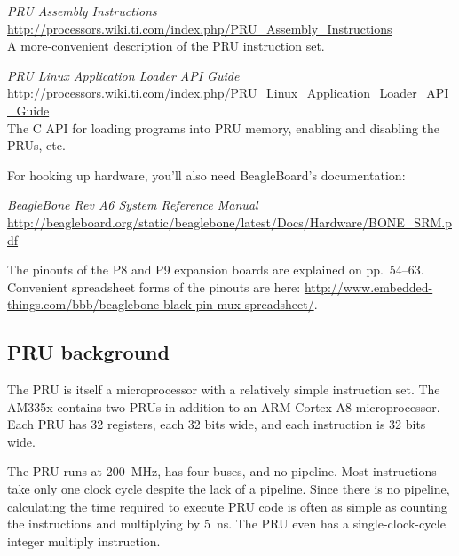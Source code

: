 \documentclass[letterpaper,11pt,fleqn]{article}
\newenvironment{docref}
   {\vspace{\baselineskip}\noindent\begin{minipage}{\textwidth}\raggedright}
   {\end{minipage}}
\begin{document}
\begin{docref}
\textit{PRU Assembly Instructions} \\
\url{http://processors.wiki.ti.com/index.php/PRU\_Assembly\_Instructions} \\
A more-convenient description of the PRU instruction set.
\end{docref}

\begin{docref}
\textit{PRU Linux Application Loader API Guide} \\
\url{http://processors.wiki.ti.com/index.php/PRU\_Linux\_Application\_Loader\_API\_Guide} \\
The C API for loading programs into PRU memory, enabling and disabling the
PRUs, etc.
\end{docref}

\vspace{\baselineskip}
\noindent
For hooking up hardware, you'll also need BeagleBoard's
documentation:

\begin{docref}
\textit{BeagleBone Rev A6 System Reference Manual} \\
\url{http://beagleboard.org/static/beaglebone/latest/Docs/Hardware/BONE\_SRM.pdf}
\end{docref}

\vspace{\baselineskip}
\noindent
The pinouts of the P8 and P9 expansion boards are explained on pp.~54--63.
Convenient spreadsheet forms of the pinouts are here:
\url{http://www.embedded-things.com/bbb/beaglebone-black-pin-mux-spreadsheet/}.

\subsection{PRU background}

The PRU is itself a microprocessor with a relatively simple instruction set.
The AM335x contains two PRUs in addition to an ARM Cortex-A8 microprocessor.
Each PRU has 32 registers, each 32 bits wide, and each instruction is 32 bits
wide.

The PRU runs at 200~MHz, has four buses, and no pipeline. Most
instructions take only one clock cycle despite the lack of a pipeline. Since
there is no pipeline, calculating the time required to execute PRU code is
often as simple as counting the instructions and multiplying by
\SI{5}{\nano\second}. The PRU even has a single-clock-cycle integer multiply
instruction.
\end{document}
